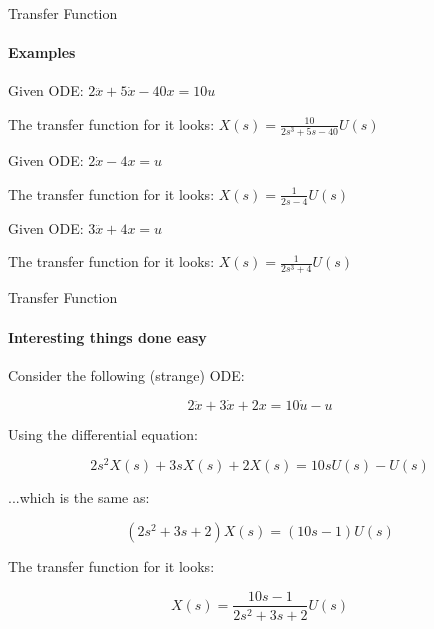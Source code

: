 \documentclass{beamer}
\begin{document}
\begin{frame}{Transfer Function}
\framesubtitle{Examples}
\begin{flushleft}

\begin{example}
Given ODE: $2 \dddot x + 5\dot x - 40 x = 10 u$

The transfer function for it looks: 
$X(s)  = \frac{10}{2 s^3 + 5 s - 40} U(s)$
\end{example}


\begin{example}
Given ODE: $2 \dot x - 4 x = u$

The transfer function for it looks: $X(s) = \frac{1}{2 s - 4} U(s)$
\end{example}


\begin{example}
Given ODE: $3 \dddot x + 4x = u$

The transfer function for it looks: $X(s) = \frac{1}{2 s^3 + 4} U(s)$
\end{example}

\end{flushleft}
\end{frame}




\begin{frame}{Transfer Function}
\framesubtitle{Interesting things done easy}
\begin{flushleft}

Consider the following (strange) ODE:

\begin{equation}
2 \ddot x + 3 \dot x + 2 x = 10 \dot u - u
\end{equation}

Using the differential equation:

\begin{equation}
2 s^2 X(s) + 3s X(s) + 2X(s) = 10s U(s) - U(s)
\end{equation}

...which is the same as:

\begin{equation}
(2s^2 + 3s + 2)X(s) = (10s - 1)U(s)
\end{equation}

The transfer function for it looks: 

\begin{equation}
X(s) = \frac{10s - 1}{2s^2 + 3s + 2} U(s)
\end{equation}

\end{flushleft}
\end{frame}
\end{document}
